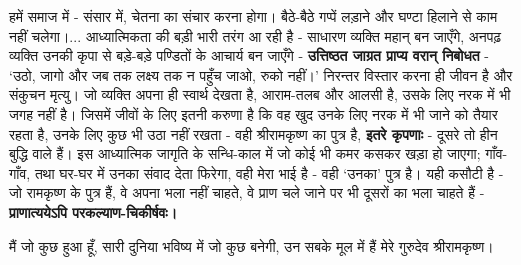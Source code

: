हमें समाज में - संसार में, चेतना का संचार करना होगा। बैठे-बैठे गप्पें लड़ाने और घण्टा हिलाने से काम नहीं चलेगा।... आध्यात्मिकता की बड़ी भारी तरंग आ रही है - साधारण व्यक्ति महान् बन जाएँगे, अनपढ़ व्यक्ति उनकी कृपा से बड़े-बड़े पण्डितों के आचार्य बन जाएँगे - \textbf{उत्तिष्ठत जाग्रत प्राप्य वरान् निबोधत } - ‘उठो, जागो और जब तक लक्ष्य तक न पहुँच जाओ, रुको नहीं।’ निरन्तर विस्तार करना ही जीवन है और संकुचन मृत्यु। जो व्यक्ति अपना ही स्वार्थ देखता है, आराम-तलब और आलसी है, उसके लिए नरक में भी जगह नहीं है। जिसमें जीवों के लिए इतनी करुणा है कि वह खुद उनके लिए नरक में भी जाने को तैयार रहता है, उनके लिए कुछ भी उठा नहीं रखता - वही श्रीरामकृष्ण का पुत्र है, \textbf{इतरे कृपणाः } - दूसरे तो हीन बुद्धि वाले हैं। इस आध्यात्मिक जागृति के सन्धि-काल में जो कोई भी कमर कसकर खड़ा हो जाएगा; गाँव-गाँव, तथा घर-घर में उनका संवाद देता फिरेगा, वही मेरा भाई है - वही ‘उनका’ पुत्र है। यही कसौटी है - जो रामकृष्ण के पुत्र हैं, वे अपना भला नहीं चाहते, वे प्राण चले जाने पर भी दूसरों का भला चाहते हैं - \textbf{प्राणात्ययेऽपि परकल्याण-चिकीर्षवः। } 

मैं जो कुछ हुआ हूँ, सारी दुनिया भविष्य में जो कुछ बनेगी, उन सबके मूल में हैं मेरे गुरुदेव श्रीरामकृष्ण। 

\delimiter

\addtoendnotes{\protect\end{multicols}}


